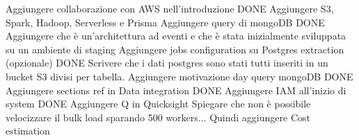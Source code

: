 Aggiungere collaborazione con AWS nell'introduzione
DONE Aggiungere S3, Spark, Hadoop, Serverless e Prisma
Aggiungere query di mongoDB
DONE Aggiungere che è un'architettura ad eventi 
e che è stata inizialmente sviluppata su un ambiente di staging
Aggiungere jobs configuration su Postgres extraction (opzionale)
DONE Scrivere che i dati postgres sono stati tutti inseriti in un bucket S3 divisi per tabella.
Aggiungere motivazione day query mongoDB
DONE Aggiungere sections ref in Data integration
DONE Aggiungere IAM all'inizio di system
DONE Aggiungere Q in Quicksight
Spiegare che non è possibile velocizzare il bulk load sparando 500 workers... Quindi aggiungere Cost estimation